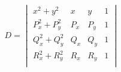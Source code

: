 \documentclass[12pt]{article}
\begin{document}
\[
    D = \begin{vmatrix}
        x^2 + y^2 & x & y & 1 \\
        P_x^2 + P_y^2 & P_x & P_y & 1 \\
        Q_x^2 + Q_y^2 & Q_x & Q_y & 1 \\
        R_x^2 + R_y^2 & R_x & R_y & 1 \\
    \end{vmatrix}
\]
\end{document}
